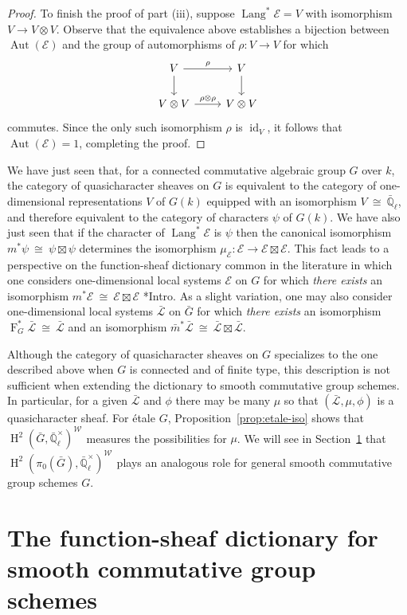 \documentclass[10pt]{amsart}
\theoremstyle{plain}
\theoremstyle{definition}
\theoremstyle{remark}
\newcommand{\EE}{\mathbb{\bar Q}_\ell}
\newcommand{\Fq}{k}
\newcommand{\EEx}{\EE^\times}
\newcommand{\Weil}[1]{\mathcal{W}_{#1}}
\newcommand{\Frob}[1]{\operatorname{F}_{#1}}
\DeclareMathOperator{\Aut}{Aut}
\DeclareMathOperator{\id}{id}
\DeclareMathOperator{\Hh}{H}
\DeclareMathOperator{\Lang}{Lang}
\newcommand{\iso}{{\ \cong\ }}
\newcommand{\qcs}[1]{{\mathcal{#1}}}
\newcommand{\gqcs}[1]{{\mathcal{\bar #1}}}
\newcommand{\bm}{\bar{m}}
\newcommand{\bG}{\bar{G}}
\begin{document}
\begin{proof}
To finish the proof of part (iii), suppose $\Lang^*\qcs{E} = V$ with isomorphism $V \to V\otimes V$.  Observe that the equivalence above establishes a bijection between $\Aut(\qcs{E})$ and the group of automorphisms of $\rho : V\to V$ for which 
\[
\begin{tikzcd}
\arrow{d}{} V \arrow{r}{\rho} & V\arrow{d}{}\\
V\otimes V \arrow{r}{\rho\otimes \rho} & V\otimes V
\end{tikzcd}
\]
commutes. 
Since the only such isomorphism $\rho$ is $\id_V$, it follows that $\Aut(\qcs{E}) = 1$, completing the proof.
\end{proof}

We have just seen that, for a connected commutative algebraic group $G$ over $\Fq$, the category of quasicharacter sheaves on $G$ is equivalent to the category of one-dimensional representations $V$ of $G(\Fq)$ equipped with an isomorphism $V\iso \EE$, and therefore equivalent to the category of characters $\psi$ of $G(\Fq)$.
We have also just seen that if the character of $\Lang^*\qcs{E}$ is $\psi$ then the canonical isomorphism $m^*\psi \iso \psi \boxtimes \psi$ determines the isomorphism $\mu_\qcs{E} : \qcs{E} \to \qcs{E}\boxtimes\qcs{E}$.
This fact leads to a perspective on the function-sheaf dictionary common in the literature in which one considers one-dimensional local systems $\qcs{E}$ on $G$ for which \emph{there exists} an isomorphism $m^*\qcs{E} \iso \qcs{E} \boxtimes\qcs{E}$ \cite{kamgarpour:09a}*{Intro}.
As a slight variation, one may also consider one-dimensional local systems $\gqcs{L}$ on $\bG$ for which \emph{there exists} an isomorphism $\Frob{G}^*\gqcs{L} \iso \gqcs{L}$ and an isomorphism $\bm^*\gqcs{L} \iso \gqcs{L} \boxtimes\gqcs{L}$.

Although the category of quasicharacter sheaves on $G$ specializes to the one described above when $G$ is connected and of finite type, this description is not sufficient when extending the dictionary to smooth commutative group schemes. 
In particular, for a given $\gqcs{L}$ and $\phi$ there may be many $\mu$ so that $(\gqcs{L},\mu,\phi)$ is a quasicharacter sheaf.  For \'etale $G$, Proposition~\ref{prop:etale-iso} shows that $\Hh^2(\bG,\EEx)^{\Weil{}}$ measures the possibilities for $\mu$.  We will see in Section~\ref{sec:main} that $\Hh^2(\pi_0(\bG),\EEx)^{\Weil{}}$ plays an analogous role for general smooth commutative group schemes $G$.

\section{The function-sheaf dictionary for smooth commutative group schemes}\label{sec:main}
\end{document}
